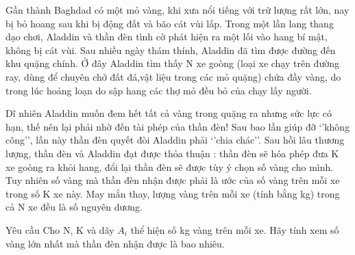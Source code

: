 Gần thành Baghdad có một mỏ vàng, khi xưa nổi tiếng với trữ lượng rất lớn, nay bị bỏ hoang sau khi bị động đất và bão cát vùi lấp. Trong một lần lang thang dạo chơi, Aladdin và thần đèn tình cờ phát hiện ra một lối vào hang bí mật, không bị cát vùi. Sau nhiều ngày thám thính, Aladdin đã tìm được đường đến khu quặng chính. Ở đây Aladdin tìm thấy N xe goòng (loại xe chạy trên đường ray, dùng để chuyên chở đất đá,vật liệu trong các mỏ quặng) chứa đầy vàng, do trong lúc hoảng loạn do sập hang các thợ mỏ đều bỏ của chạy lấy người.

Dĩ nhiên Aladdin muốn đem hết tất cả vàng trong quặng ra nhưng sức lực có hạn, thế nên lại phải nhờ đến tài phép của thần đèn! Sau bao lần giúp đỡ ‘’không công’’, lần này thần đèn quyết đòi Aladdin phải ‘’chia chác’’. Sau hồi lâu thương lượng, thần đèn và Aladdin đạt được thỏa thuận : thần đèn sẽ hóa phép đưa K xe goòng ra khỏi hang, đổi lại thần đèn sẽ được tùy ý chọn số vàng cho mình. Tuy nhiên số vàng mà thần đèn nhận được phải là ước của số vàng trên mỗi xe trong số K xe này. May mắn thay, lượng vàng trên mỗi xe (tính bằng kg) trong cả N xe đều là số nguyên dương.

Yêu cầu
Cho N, K và dãy $A_{i}$ thể hiện số kg vàng trên mỗi xe. Hãy tính xem số vàng lớn nhất mà thần đèn nhận được là bao nhiêu.